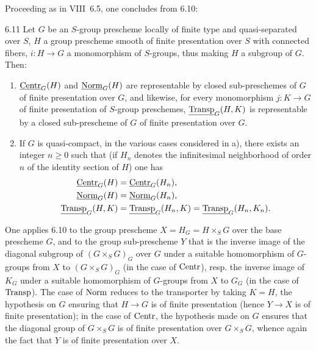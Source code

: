 Proceeding as in VIII~6.5, one concludes from 6.10:
\begin{corollary}{6.11}\label{XI.6.11}
Let $G$ be an $S$-group prescheme locally of finite type and quasi-separated over $S$, $H$ a group prescheme smooth of finite presentation over $S$ with connected fibers, $i:H\to G$ a monomorphism of $S$-groups, thus making $H$ a subgroup of $G$. Then:
\begin{enumerate}[label=\alph*)]
\item $\underline{\mathrm{Centr}}_G(H)$ and $\underline{\mathrm{Norm}}_G(H)$ are representable by closed sub-preschemes of $G$ of finite presentation over $G$, and likewise, for every monomorphism $j:K\to G$ of finite presentation of $S$-group preschemes, $\underline{\operatorname{Transp}}_G(H,K)$ is representable by a closed sub-prescheme of $G$ of finite presentation over $G$.
\item If $G$ is quasi-compact, in the various cases considered in a), there exists an integer $n\ge0$ such that (if $H_n$ denotes the infinitesimal neighborhood of order $n$ of the identity section of $H$) one has
\[
\begin{aligned}
\underline{\mathrm{Centr}}_G(H)&=\underline{\mathrm{Centr}}_G(H_n),\\
\underline{\mathrm{Norm}}_G(H)&=\underline{\mathrm{Norm}}_G(H_n),\\
\underline{\operatorname{Transp}}_G(H,K)&=\underline{\operatorname{Transp}}_G(H_n,K)=\underline{\operatorname{Transp}}_G(H_n,K_n).
\end{aligned}
\]
\end{enumerate}
\end{corollary}
One applies 6.10 to the group prescheme $X=H_G=H\times_S G$ over the base prescheme $G$, and to the group sub-prescheme $Y$ that is the inverse image of the diagonal subgroup of $(G\times_S G)_G$ over $G$ under a suitable homomorphism of $G$-groups from $X$ to $(G\times_S G)_G$ (in the case of $\operatorname{Centr}$), resp. the inverse image of $K_G$ under a suitable homomorphism of $G$-groups from $X$ to $G_G$ (in the case of $\operatorname{Transp}$). The case of $\operatorname{Norm}$ reduces to the transporter by taking $K=H$, the hypothesis on $G$ ensuring that $H\to G$ is of finite presentation (hence $Y\to X$ is of finite presentation); in the case of $\operatorname{Centr}$, the hypothesis made on $G$ ensures that the diagonal group of $G\times_S G$ is of finite presentation over $G\times_S G$, whence again the fact that $Y$ is of finite presentation over $X$.
